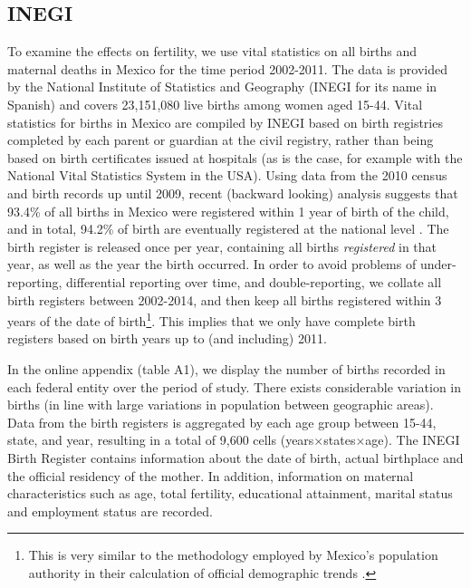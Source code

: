 \documentclass[a4paper,11pt]{article}
\begin{document}
\begin{spacing}{1.5}
\subsection{INEGI}
To examine the effects on fertility, we use vital statistics on all births and maternal deaths in Mexico for the time period 2002-2011. The data is provided by the National Institute of Statistics and Geography (INEGI for its name in Spanish) and covers 23,151,080 live births among women aged 15-44.  Vital statistics for births in Mexico are compiled by INEGI based on birth registries completed by each parent or guardian at the civil registry, rather than being based on birth certificates issued at hospitals (as is the case, for example with the National Vital Statistics System in the USA).  Using data from the 2010 census and birth records up until 2009, recent (backward looking) analysis suggests that 93.4\% of all births in Mexico were registered within 1 year of birth of the child, and in total, 94.2\% of birth are eventually registered at the national level \citep{INEGI2012}.  The birth register is released once per year, containing all births \emph{registered} in that year, as well as the year the birth occurred.  In order to avoid problems of under-reporting, differential reporting over time, and double-reporting, we collate all birth registers between 2002-2014, and then keep all births registered within 3 years of the date of birth\footnote{This is very similar to the methodology employed by Mexico's population authority in their calculation of official demographic trends \citep{CONAPO2012}.}.  This implies that we only have complete birth registers based on birth years up to (and including) 2011.


In the online appendix (table A1), we display the number of births recorded in each federal entity over the period of study.  There exists considerable variation in births (in line with large variations in population between geographic areas).     Data from the birth registers is aggregated by each age group between 15-44, state, and year, resulting in a total of 9,600 cells (years$\times$states$\times$age). The INEGI Birth Register contains information about the date of birth, actual birthplace and the official residency of the mother. In addition, information on maternal characteristics such as age, total fertility, educational attainment, marital status and employment status are recorded. 

\end{spacing}
\end{document}
